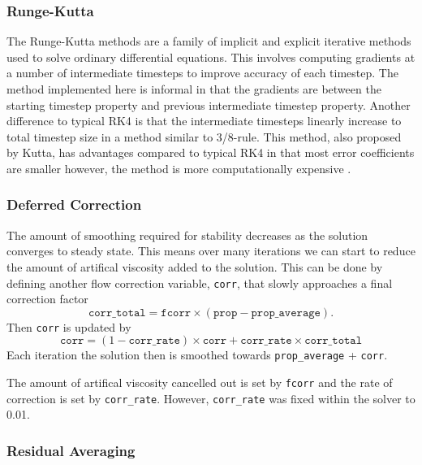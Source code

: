\documentclass{article}
\begin{document}
\subsubsection{Runge-Kutta}

The Runge-Kutta methods are a family of implicit and explicit iterative methods used to solve ordinary differential equations.
This involves computing gradients at a number of intermediate timesteps to improve accuracy of each timestep.
The method implemented here is informal in that the gradients are between the starting timestep property and previous intermediate timestep property.
Another difference to typical RK4 is that the intermediate timesteps linearly increase to total timestep size in a method similar to 3/8-rule.
This method, also proposed by Kutta, has advantages compared to typical RK4 in that most error coefficients are smaller however, the method is more computationally expensive \cite{solve_ODE_nonstiff}.


\subsubsection{Deferred Correction}

The amount of smoothing required for stability decreases as the solution converges to steady state.
This means over many iterations we can start to reduce the amount of artifical viscosity added to the solution.
This can be done by defining another flow correction variable, \texttt{corr}, that slowly approaches a final correction factor
\begin{equation}
    \texttt{corr\_total} = \texttt{fcorr} \times (\texttt{prop} - \texttt{prop\_average}).
\end{equation}
Then \texttt{corr} is updated by
\begin{equation}
    \texttt{corr} = (1 - \texttt{corr\_rate}) \times \texttt{corr} + \texttt{corr\_rate} \times \texttt{corr\_total} \label{eq:corr_rate}
\end{equation}
Each iteration the solution then is smoothed towards \texttt{prop\_average} + \texttt{corr}.

The amount of artifical viscosity cancelled out is set by \texttt{fcorr} and the rate of correction is set by \texttt{corr\_rate}.
However, \texttt{corr\_rate} was fixed within the solver to 0.01.

\subsubsection{Residual Averaging}
\end{document}
